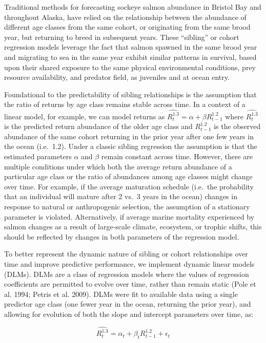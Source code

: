 \documentclass[
]{article}
\begin{document}
Traditional methods for forecasting sockeye salmon abundance in Bristol Bay and throughout Alaska, have relied on the relationship between the abundance of different age classes from the same cohort, or originating from the same brood year, but returning to breed in subsequent years. These ``sibling'' or cohort regression models leverage the fact that salmon spawned in the same brood year and migrating to sea in the same year exhibit similar patterns in survival, based upon their shared exposure to the same physical environmental conditions, prey resource availability, and predator field, as juveniles and at ocean entry.

Foundational to the predictability of sibling relationships is the assumption that the ratio of returns by age class remains stable across time. In a context of a linear model, for example, we can model returns as \(\hat{R^{1.3}_t} = \alpha + \beta{R^{1.2}_{t-1}}\) where \(\hat{R^{1.3}_t}\) is the predicted return abundance of the older age class and \(R^{1.2}_{t-1}\) is the observed abundance of the same cohort returning in the prior year after one few years in the ocean (i.e.~1.2). Under a classic sibling regression the assumption is that the estimated parameters \(\alpha\) and \(\beta\) remain constant across time. However, there are multiple conditions under which both the average return abundance of a particular age class or the ratio of abundances among age classes might change over time. For example, if the average maturation schedule (i.e.~the probability that an individual will mature after 2 vs.~3 years in the ocean) changes in response to natural or anthropogenic selection, the assumption of a stationary parameter is violated. Alternatively, if average marine mortality experienced by salmon changes as a result of large-scale climate, ecosystem, or trophic shifts, this should be reflected by changes in both parameters of the regression model.

To better represent the dynamic nature of sibling or cohort relationships over time and improve predictive performance, we implement dynamic linear models (DLMs). DLMs are a class of regression models where the values of regression coefficients are permitted to evolve over time, rather than remain static (Pole et al. 1994; Petris et al. 2009). DLMs were fit to available data using a single predictor age class (one fewer year in the ocean, returning the prior year), and allowing for evolution of both the slope and intercept parameters over time, as:

\[\hat{R^{1.3}_t} = \alpha_t + \beta_t{R^{1.2}_{t-1}} + \epsilon_t\]
\end{document}
